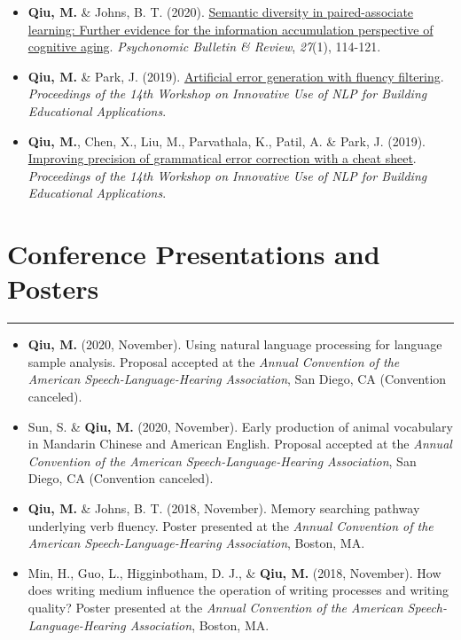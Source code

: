 \documentclass[11pt]{article}
\newcommand{\resumesection}[1]{\vspace{-0.2cm}\section*{#1}\vspace{-0.2cm}\hrule\vspace{0.2cm}}
\begin{document}
\begin{itemize}[leftmargin=!,labelindent=!,itemindent=-15pt]
\setlength\itemsep{0.3em}


\item[] \textbf{Qiu, M.} \& Johns, B. T. (2020). \href{https://rdcu.be/bYRm5}{Semantic diversity in paired-associate learning: Further evidence for the information accumulation perspective of cognitive aging}. \textit{Psychonomic Bulletin \& Review}, \textit{27}(1), 114-121.

\item[] \textbf{Qiu, M.} \& Park, J. (2019). \href{https://www.aclweb.org/anthology/W19-4408/}{Artificial error generation with fluency filtering}. \textit{Proceedings of the 14th Workshop on Innovative Use of NLP for Building Educational Applications}.

\item[] \textbf{Qiu, M.}, Chen, X., Liu, M., Parvathala, K., Patil, A. \& Park, J. (2019). \href{https://www.aclweb.org/anthology/W19-4425/}{Improving precision of grammatical error correction with a cheat sheet}. \textit{Proceedings of the 14th Workshop on Innovative Use of NLP for Building Educational Applications}.

\end{itemize}

\resumesection{Conference Presentations and Posters}

\begin{itemize}[leftmargin=!,labelindent=!,itemindent=-15pt]
\setlength\itemsep{0.3em}
\item[] \textbf{Qiu, M.} (2020, November). Using natural language processing for language sample analysis. Proposal accepted at the \textit{Annual Convention of the American Speech-Language-Hearing Association}, San Diego, CA (Convention canceled).

\item[] Sun, S. \& \textbf{Qiu, M.} (2020, November). Early production of animal vocabulary in Mandarin Chinese and American English. Proposal accepted at the \textit{Annual Convention of the American Speech-Language-Hearing Association}, San Diego, CA (Convention canceled).

\item[] \textbf{Qiu, M.} \& Johns, B. T. (2018, November). Memory searching pathway underlying verb fluency. Poster presented at the \textit{Annual Convention of the American Speech-Language-Hearing Association}, Boston, MA.

\item[] Min, H., Guo, L., Higginbotham, D. J., \& \textbf{Qiu, M.} (2018, November). How does writing medium influence the operation of writing processes and writing quality? Poster presented at the \textit{Annual Convention of the American Speech-Language-Hearing Association}, Boston, MA.

\end{itemize}
\end{document}
